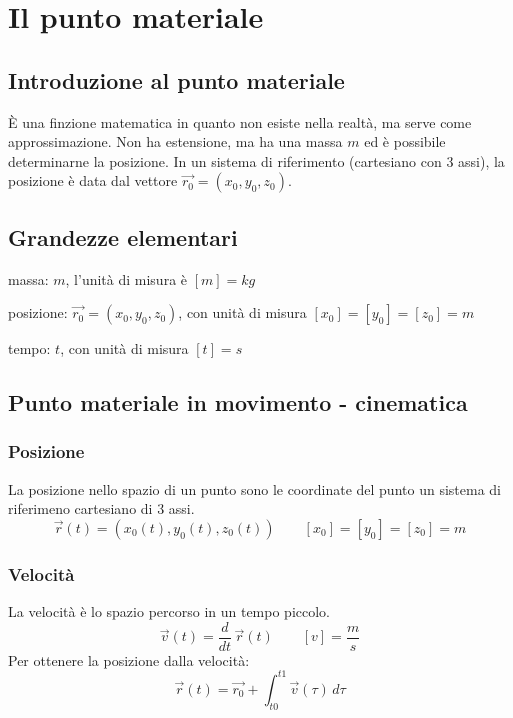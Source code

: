 \documentclass[a4paper]{article}
\newcommand\dt{\frac{d}{dt}\,}
\begin{document}
\section{Il punto materiale}
\subsection{Introduzione al punto materiale}
È una finzione matematica in quanto non esiste nella realtà, ma serve come approssimazione. Non ha estensione, ma ha una massa
\(m\) ed è possibile determinarne la posizione. In un sistema di riferimento (cartesiano con 3 assi), la posizione è data dal
vettore \(\vec{r_0} = \left(x_0, y_0, z_0\right)\).

\subsection{Grandezze elementari}

massa: \(m\), l'unità di misura è \(\left[m\right] = kg\)

posizione: \(\vec{r_0} = \left(x_0, y_0, z_0\right)\), con unità di misura \(\left[x_0\right] = \left[y_0\right] = \left[z_0\right] = m\)

tempo: \(t\), con unità di misura \(\left[t\right] = s\)

\newpage


\subsection{Punto materiale in movimento - cinematica}
\subsubsection*{Posizione}
La posizione nello spazio di un punto sono le coordinate del punto un sistema di riferimeno cartesiano di 3 assi.
\[\vec{r}(t) = \left(x_0(t), y_0(t), z_0(t)\right) \qquad \left[x_0\right] = \left[y_0\right] = \left[z_0\right] = m\]

\subsubsection*{Velocità}
La velocità è lo spazio percorso in un tempo piccolo. \[\vec{v}(t) = \dt \vec{r}(t) \qquad \left[v\right] = \frac{m}{s}\]
Per ottenere la posizione dalla velocità: \[\vec{r}(t) = \vec{r_0} + \int_{t0}^{t1} \vec{v}(\tau) \, d\tau\]
\end{document}
